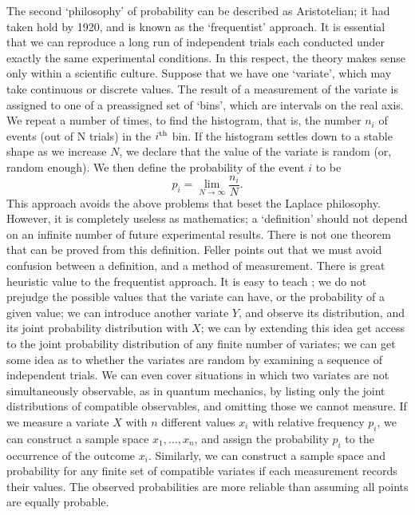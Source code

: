 The second `philosophy' of probability can be described as Aristotelian;
it had taken hold by 1920, and is known as the
`frequentist' approach. It is essential that we can reproduce a long run
of independent trials each conducted under exactly the same experimental
conditions. In this respect, the theory makes sense only within a
scientific culture. Suppose that we have one
`variate', which may take continuous or discrete values. The result
of a measurement of the variate is assigned to one of a
preassigned set of `bins', which are intervals on the real axis.
We repeat a number of times, to find the histogram, that is, the number
$n_i$ of
events (out of N trials) in the $i^{\rm th}$ bin. If the histogram settles
down to a stable shape as we increase $N$, we declare that the value of the
variate is random (or, random enough). We then define the probability of
the event $i$ to be
\begin{equation}
p_i=\lim_{N\rightarrow\infty}\frac{n_i}{N}.
\end{equation}
This approach avoids the above problems that beset the Laplace philosophy.
However, it is completely useless as mathematics; a `definition'
should not depend on an infinite number of future experimental results.
There is not one theorem that can be
proved from this definition. Feller points out that we must avoid
confusion between a definition, and a method of measurement.
There is great heuristic value to the frequentist approach.
It is easy to teach \cite{Decker};
we do not prejudge the possible values that the variate
can have, or the probability of a given value; we can
introduce another variate $Y$, and observe its distribution, and its
joint probability distribution with $X$;
we can by extending this idea get access to the
joint probability distribution of any finite number of variates;
we can get some idea as to whether the variates
are random by examining a sequence of independent trials. We can even cover
situations in which two variates are not simultaneously observable, as in
quantum mechanics, by listing only the joint distributions of compatible
observables, and omitting those we cannot measure.
If we measure a variate $X$ with $n$ different values $x_i$ with relative
frequency $p_i$, we can construct a sample space $x_1,\ldots,x_n$, and
assign the probability $p_i$ to the occurrence of the outcome $x_i$.
Similarly, we can construct a sample space and probability for any
finite set of compatible variates if each measurement records their
values. The observed probabilities are more reliable than assuming all
points are equally probable.

